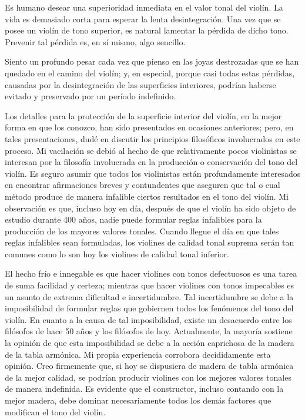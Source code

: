 \documentclass[12pt]{book}
\begin{document}
Es humano desear una superioridad inmediata en el valor tonal del violín. La vida es demasiado corta para esperar la lenta desintegración. Una vez que se posee un violín de tono superior, es natural lamentar la pérdida de dicho tono. Prevenir tal pérdida es, en sí mismo, algo sencillo.

Siento un profundo pesar cada vez que pienso en las joyas destrozadas que se han quedado en el camino del violín; y, en especial, porque casi todas estas pérdidas, causadas por la desintegración de las superficies interiores, podrían haberse evitado y preservado por un período indefinido.

Los detalles para la protección de la superficie interior del violín, en la mejor forma en que los conozco, han sido presentados en ocasiones anteriores; pero, en tales presentaciones, dudé en discutir los principios filosóficos involucrados en este proceso. Mi vacilación se debió al hecho de que relativamente pocos violinistas se interesan por la filosofía involucrada en la producción o conservación del tono del violín. Es seguro asumir que todos los violinistas están profundamente interesados en encontrar afirmaciones breves y contundentes que aseguren que tal o cual método produce de manera infalible ciertos resultados en el tono del violín. Mi observación es que, incluso hoy en día, después de que el violín ha sido objeto de estudio durante 400 años, nadie puede formular reglas infalibles para la producción de los mayores valores tonales. Cuando llegue el día en que tales reglas infalibles sean formuladas, los violines de calidad tonal suprema serán tan comunes como lo son hoy los violines de calidad tonal inferior. 

El hecho frío e innegable es que hacer violines con tonos defectuosos es una tarea de suma facilidad y certeza; mientras que hacer violines con tonos impecables es un asunto de extrema dificultad e incertidumbre. Tal incertidumbre se debe a la imposibilidad de formular reglas que gobiernen todos los fenómenos del tono del violín.
En cuanto a la causa de tal imposibilidad, existe un desacuerdo entre los filósofos de hace 50 años y los filósofos de hoy. Actualmente, la mayoría sostiene la opinión de que esta imposibilidad se debe a la acción caprichosa de la madera de la tabla armónica. Mi propia experiencia corrobora decididamente esta opinión. Creo firmemente que, si hoy se dispusiera de madera de tabla armónica de la mejor calidad, se podrían producir violines con los mejores valores tonales de manera indefinida. Es evidente que el constructor, incluso contando con la mejor madera, debe dominar necesariamente todos los demás factores que modifican el tono del violín. 
\end{document}
